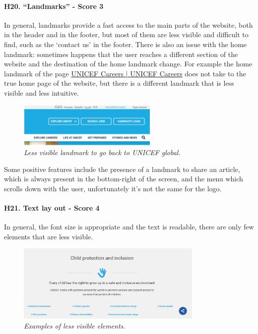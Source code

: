 \newline
\newline \paragraph{H20. “Landmarks” - Score 3}	\label{subsec:H20}In general, landmarks provide a fast access to the main parts of the website, both in the header and in the footer, but most of them are less visible and difficult to find, such as the ‘contact us’ in the footer.
\newline There is also an issue with the home landmark: sometimes happens that the user reaches a different section of the website and the destination of the home landmark change. For example the home landmark of the page \href{https://www.unicef.org/careers/}{UNICEF Careers | UNICEF Careers} does not take to the true home page of the website, but there is a different landmark that is less visible and less intuitive.
\begin{figure}[!h]
	\begin{center}
		\includegraphics[width=0.6\textwidth]{FinalScores23.jpg}
		\captionsetup{font=small}
		\caption{\textit{Less visible landmark to go back to UNICEF global.}}
	\end{center}
\end{figure}
\newline Some positive features include the presence of a landmark to share an article, which is always present in the bottom-right of the screen, and the menu which scrolls down with the user, unfortunately it’s not the same for the logo.
\newline
\newline \paragraph{H21. Text lay out - Score 4}  \label{subsec:H21}	In general, the font size is appropriate and the text is readable, there are only few elements that are less visible.
\begin{figure}[!h]
	\begin{center}
		\includegraphics[width=0.8\textwidth]{FinalScores24.jpg}
		\captionsetup{font=small}
		\caption{\textit{Examples of less visible elements.}}
	\end{center}
\end{figure}
